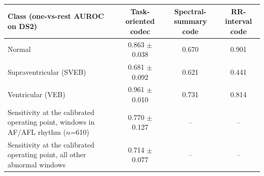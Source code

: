 \begin{tabular}{lccc}
\toprule
Class (one-vs-rest AUROC on DS2) & Task-oriented codec & Spectral-summary code & RR-interval code \\
\midrule
Normal & 0.863 $\pm$ 0.038 & 0.670 & 0.901 \\
Supraventricular (SVEB) & 0.681 $\pm$ 0.092 & 0.621 & 0.441 \\
Ventricular (VEB) & 0.961 $\pm$ 0.010 & 0.731 & 0.814 \\
\midrule
Sensitivity at the calibrated operating point, windows in AF/AFL rhythm ($n$=610) & 0.770 $\pm$ 0.127 & -- & -- \\
Sensitivity at the calibrated operating point, all other abnormal windows & 0.714 $\pm$ 0.077 & -- & -- \\
\bottomrule
\end{tabular}
